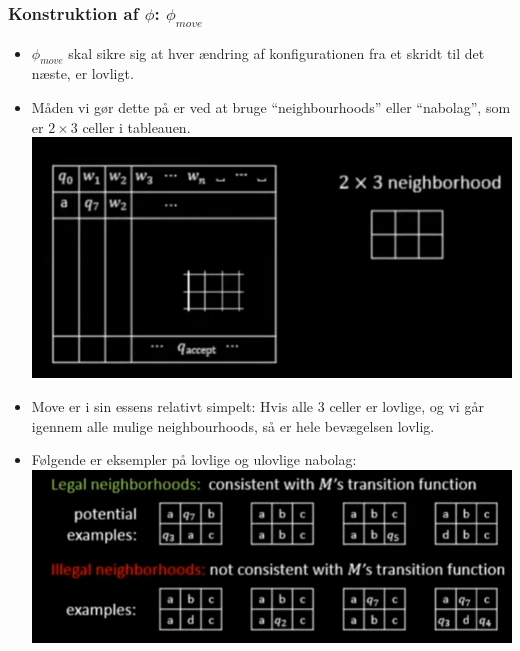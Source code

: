\begin{frame}[allowframebreaks]
  \frametitle{Konstruktion af \(\phi\): \(\phi_{move}\)}
\begin{itemize}
  \item \(\phi_{move}\) skal sikre sig at hver ændring af konfigurationen fra et skridt til det næste, er lovligt.
  \item Måden vi gør dette på er ved at bruge ``neighbourhoods'' eller ``nabolag'', som er $2\times3$ celler i tableauen.
		\includegraphics[scale=0.4]{figur/video16d.png}
  \item Move er i sin essens relativt simpelt: Hvis alle 3 celler er lovlige, og vi går igennem alle mulige neighbourhoods, så er hele bevægelsen lovlig.
  \item Følgende er eksempler på lovlige og ulovlige nabolag:
		\includegraphics[scale=0.4]{figur/video16e.png}


\end{itemize}
\end{frame}
